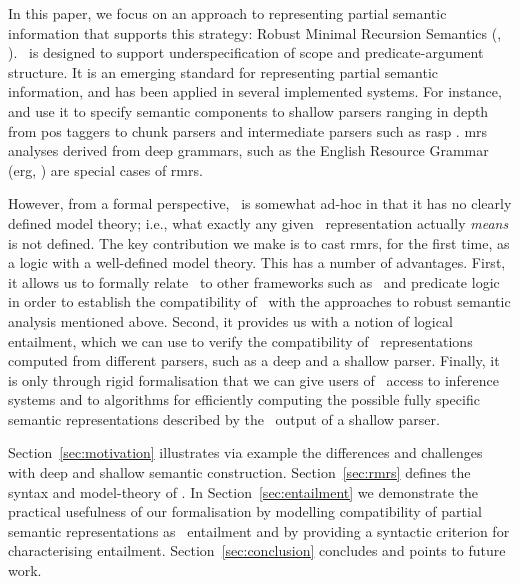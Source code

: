 In this paper, we focus on an approach to representing partial
semantic information that supports this strategy: Robust Minimal
Recursion Semantics (\rmrs, \cite{copestake:2003}).  \rmrs\ is
designed to
support underspecification of scope and predicate-argument structure.
It is an emerging standard for representing partial
semantic information, and has been applied in several implemented
systems.  For instance,  and
 use it to specify semantic components to shallow
parsers ranging in depth from {\sc pos} taggers to chunk parsers and
intermediate parsers such as {\sc rasp} \cite{briscoe:etal:2006}.
{\sc mrs} analyses \cite{copestake:etal:2005}
derived from deep grammars, such as the English
Resource Grammar ({\sc erg}, \cite{copestake:flickinger:2000}) are
special cases of {\sc rmrs}.

However, from a formal perspective, \rmrs\ is somewhat ad-hoc in that
it has no clearly defined model theory; i.e., what exactly any given
\rmrs\ representation actually \emph{means} is not defined.  The key
contribution we make is to cast {\sc rmrs}, for the first time, as a
logic with a well-defined model theory.  This has a number of
advantages.  First, it allows us to formally relate \rmrs\ to other
frameworks such as \mrs\ and predicate logic in order to establish the
compatibility of \rmrs\ with the approaches to robust semantic
analysis mentioned above.  
Second, it provides us with a notion of logical
entailment, which we can use to verify the compatibility of \rmrs\ 
representations computed from different parsers, such as a deep and a
shallow parser.  Finally, it is only through rigid formalisation that
we can give users of \rmrs\ access to inference systems and to
algorithms for efficiently computing the possible fully specific
semantic representations described by the \rmrs\ output of a shallow
parser.

Section~\ref{sec:motivation} illustrates via example the differences
and challenges with deep and shallow semantic construction.
Section~\ref{sec:rmrs} defines the syntax and model-theory of \rmrs.
In Section~\ref{sec:entailment} we demonstrate the practical
usefulness of our formalisation by modelling compatibility of partial
semantic representations as \rmrs\ entailment and by providing a
syntactic criterion for characterising entailment.
Section~\ref{sec:conclusion} concludes and points to future work.



